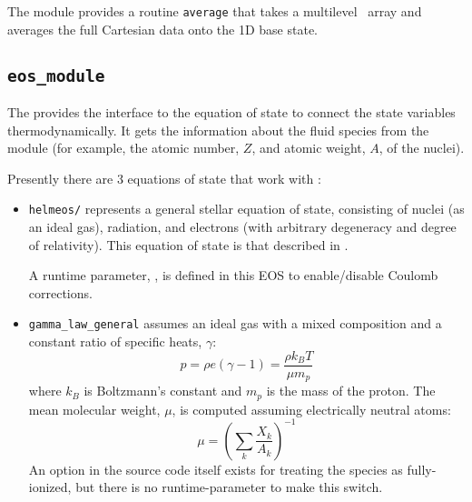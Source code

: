 The  module provides a routine {\tt average} that takes
a multilevel \multifab\ array and averages the full Cartesian data
onto the 1D base state.

\subsection{{\tt eos\_module}}

The  provides the interface to the equation of 
state to connect the state variables thermodynamically.  It 
gets the information about the fluid species from the 
module (for example, the atomic number, $Z$, and atomic weight, $A$,
of the nuclei).

Presently there are 3 equations of state that work with \maestro:
\begin{itemize}
\item {\tt helmeos/} represents a general stellar equation 
      of state, consisting of nuclei (as an ideal gas), radiation,
      and electrons (with arbitrary degeneracy and degree of relativity).
      This equation of state is that described in \cite{timmes_eos}.

      A runtime parameter, , is defined in
      this EOS to enable/disable Coulomb corrections.

\item {\tt gamma\_law\_general} assumes an ideal gas with a mixed 
     composition and a constant ratio of specific heats, $\gamma$:
      \begin{equation}
      p = \rho e (\gamma - 1) = \frac{\rho k_B T}{\mu m_p} 
      \end{equation}
     where $k_B$ is Boltzmann's constant and $m_p$ is the mass of the
     proton.
     The mean molecular weight, $\mu$, is computed assuming 
     electrically neutral atoms:
     \begin{equation}
     \mu = \left ( \sum_k \frac{X_k}{A_k} \right )^{-1}
     \end{equation}
     An option in the source code itself exists for treating the
     species as fully-ionized, but there is no runtime-parameter to
     make this switch.


\end{itemize}
